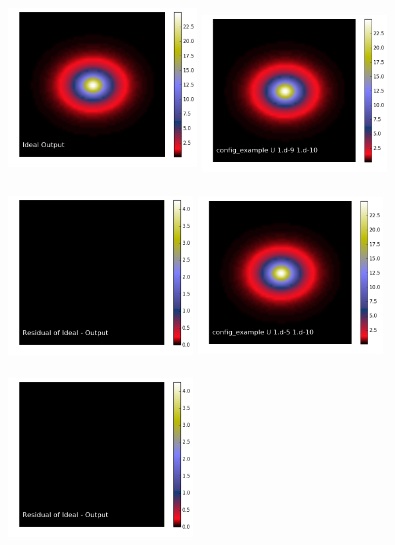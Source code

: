 \documentclass[12pt,preprint]{aastex6}
\begin{document}
\begin{figure}[!htbp]
\centering
\advance\leftskip-1.0cm
\advance\rightskip-1.0cm
\hspace{3.5cm}
\includegraphics[height=50mm,width=50mm]{f3a.png}
\newline
\includegraphics[height=47mm,width=49mm]{f3b.png}
\includegraphics[height=47mm,width=49mm]{f3c.png}
\includegraphics[height=47mm,width=49mm]{f3d.png}
\includegraphics[height=47mm,width=49mm]{f3e.png}

\end{figure}
\end{document}
